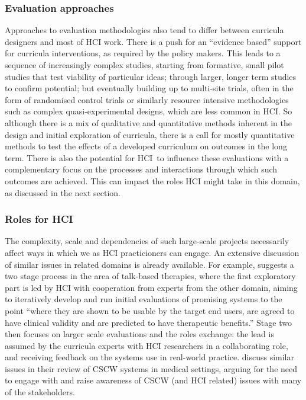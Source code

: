 \documentclass[prodmode,acmtochi]{acmsmall}
\begin{document}
\subsubsection{Evaluation approaches}
Approaches to evaluation methodologies also tend to differ between curricula designers and most of HCI work. There is a push for an ``evidence based'' support for curricula interventions, as required by the policy makers. This leads to a sequence of increasingly complex studies, starting from formative, small pilot studies that test viability of particular ideas; through larger, longer term studies to confirm potential; but eventually building up to multi-site trials, often in the form of randomised control trials or similarly resource intensive methodologies such as complex quasi-experimental designs, which are less common in HCI.  So although there is a mix of qualitative and quantitative methods inherent in the design and initial exploration of curricula, there is a call for mostly quantitative methods to test the effects of a developed curriculum on outcomes in the long term. There is also the potential for HCI\ to influence these evaluations with a complementary focus on the processes and interactions through which such outcomes are achieved. This can impact the roles HCI might take in this domain, as discussed in the next section. 



\subsubsection{Roles for HCI}
The complexity, scale and dependencies of such large-scale projects necessarily affect ways in which we as HCI practicioners can engage.  An extensive discussion of similar issues in related domains is already available. 
%
For example,  suggests a two stage process in the area of talk-based therapies, where the first exploratory part is led by HCI with cooperation from experts from the other domain, aiming to iteratively develop and run initial evaluations of promising systems to the point ``where they are shown to be usable by the target end users, are agreed to have clinical validity and are predicted to have therapeutic benefits.'' Stage two then focuses on larger scale evaluations and the roles exchange: the lead is assumed by the curricula experts with HCI researchers in a collaborating role, and receiving feedback on the systems use in real-world practice.
 discuss similar issues in their review of CSCW systems in medical settings, arguing for the need to engage with and raise awareness of CSCW (and HCI related) issues with many of the stakeholders. 
\end{document}
